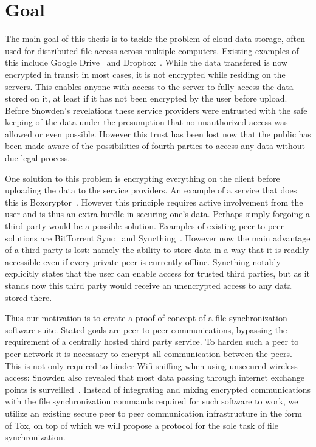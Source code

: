 \section{Goal}
\label{sec:Goal}

The main goal of this thesis is to tackle the problem of cloud data storage, often used for distributed file access across multiple computers.
Existing examples of this include Google Drive~\cite{web:site:gdrive} and Dropbox~\cite{web:site:dropbox}.
While the data transfered is now encrypted in transit in most cases, it is not encrypted while residing on the servers.
This enables anyone with access to the server to fully access the data stored on it, at least if it has not been encrypted by the user before upload.
Before Snowden's revelations these service providers were entrusted with the safe keeping of the data under the presumption that no unauthorized access was allowed or even possible.
However this trust has been lost now that the public has been made aware of the possibilities of fourth parties to access any data without due legal process.

One solution to this problem is encrypting everything on the client before uploading the data to the service providers.
An example of a service that does this is Boxcryptor~\cite{web:site:boxcryptor}.
However this principle requires active involvement from the user and is thus an extra hurdle in securing one's data.
Perhaps simply forgoing a third party would be a possible solution.
Examples of existing peer to peer solutions are BitTorrent Sync~\cite{web:site:bittorrent_sync} and Syncthing~\cite{web:site:synthing}.
However now the main advantage of a third party is lost: namely the ability to store data in a way that it is readily accessible even if every private peer is currently offline.
Syncthing notably explicitly states that the user can enable access for trusted third parties, but as it stands now this third party would receive an unencrypted access to any data stored there.

Thus our motivation is to create a proof of concept of a file synchronization software suite.
Stated goals are peer to peer communications, bypassing the requirement of a centrally hosted third party service.
To harden such a peer to peer network it is necessary to encrypt all communication between the peers.
This is not only required to hinder Wifi sniffing when using unsecured wireless access: Snowden also revealed that most data passing through internet exchange points is surveilled~\cite{web:site:heise:decix}.
Instead of integrating and mixing encrypted communications with the file synchronization commands required for such software to work, we utilize an existing secure peer to peer communication infrastructure in the form of Tox, on top of which we will propose a protocol for the sole task of file synchronization.

